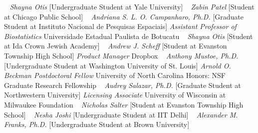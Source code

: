     \newline
~
\Gap{}
\textit{Shayna Otis}
    [Undergraduate Student at Yale University]
\newline
~
\Gap{}
\textit{Zabin Patel}
    [Student at Chicago Public School]
\newline
~
\Gap{}
\textit{Andriana S. L. O. Campanharo, Ph.D.}
    [Graduate Student at Instituto Nacional de Pesquisas Espaciais]
\newline
    \textit{Assistant Professor of Biostatistics}
    \newline
    Universidade Estadual Paulista de Botucatu
    \newline
~
\Gap{}
\textit{Shayna Otis}
    [Student at Ida Crown Jewish Academy]
\newline
~
\Gap{}
\textit{Andrew J. Scheff}
    [Student at Evanston Township High School]
\newline
    \textit{Product Manager}
    \newline
    Dropbox
    \newline
~
\Gap{}
\textit{Anthony Mustoe, Ph.D.}
    [Undergraduate Student at Washington University of St. Louis]
\newline
    \textit{Arnold O. Beckman Postdoctoral Fellow}
    \newline
    University of North Carolina
    \newline
    {\footnotesize Honors: NSF Graduate Research Fellowship}
    \newline
~
\Gap{}
\textit{Audrey Salazar, Ph.D.}
    [Graduate Student at Northwestern University]
\newline
    \textit{Licensing Associate}
    \newline
    University of Wisconsin at Milwaukee Foundation
    \newline
~
\Gap{}
\textit{Nicholas Salter}
    [Student at Evanston Township High School]
\newline
~
\Gap{}
\textit{Nesha Joshi}
    [Undergraduate Student at IIT Delhi]
\newline
~
\Gap{}
\textit{Alexander M. Franks, Ph.D.}
    [Undergraduate Student at Brown University]
\newline

